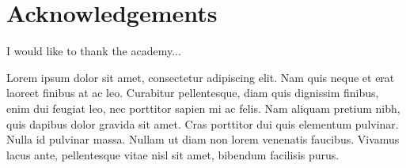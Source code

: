 \chapter*{Acknowledgements}
{\singlespacing

I would like to thank the academy...

Lorem ipsum dolor sit amet, consectetur adipiscing elit. Nam quis neque et erat laoreet finibus at ac leo. Curabitur pellentesque, diam quis dignissim finibus, enim dui feugiat leo, nec porttitor sapien mi ac felis. Nam aliquam pretium nibh, quis dapibus dolor gravida sit amet. Cras porttitor dui quis elementum pulvinar. Nulla id pulvinar massa. Nullam ut diam non lorem venenatis faucibus. Vivamus lacus ante, pellentesque vitae nisl sit amet, bibendum facilisis purus.


}